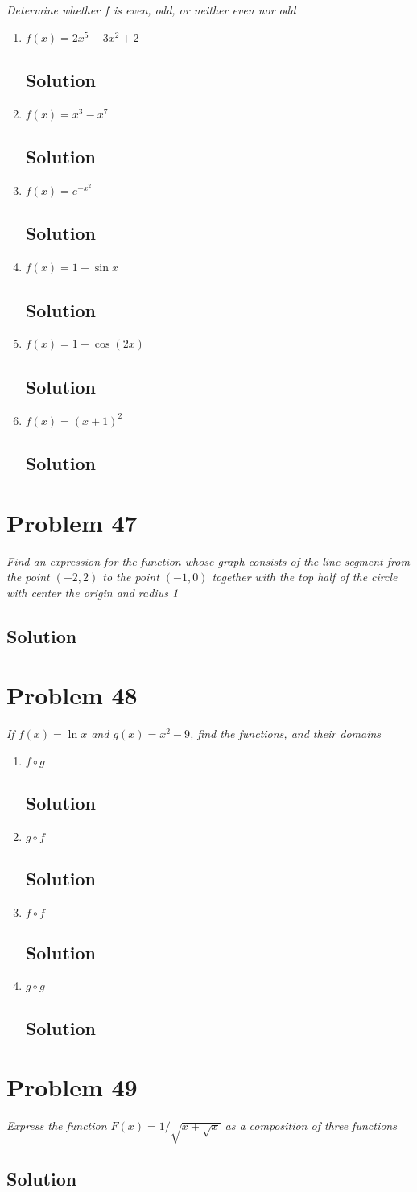 \documentclass[11pt]{article}
\newcommand{\soln}{\subsection*}
\newcommand{\qn}{\textit}
\begin{document}
\qn{Determine whether $f$ is even, odd, or neither even nor odd}
\begin{enumerate}
	\item \qn{$f(x)=2x^5-3x^2+2$}
	\soln{Solution}
	
	\item \qn{$f(x)=x^3-x^7$}
	\soln{Solution}
	
	\item \qn{$f(x)=e^{-x^2}$}
	\soln{Solution}
	
	\item \qn{$f(x)=1+\sin{x}$}
	\soln{Solution}
	
	\item \qn{$f(x)=1-\cos(2x)$}
	\soln{Solution}
	
	\item \qn{$f(x)=(x+1)^2$}
	\soln{Solution}
\end{enumerate}

\section*{Problem 47}

\qn{Find an expression for the function whose graph consists of the line segment from the point $(-2, 2)$ to the point $(-1, 0)$ together with the top half of the circle with center the origin and radius 1}
\soln{Solution}

\section*{Problem 48}

\qn{If $f(x)=\ln{x}$ and $g(x)=x^2-9$, find the functions, and their domains}
\begin{enumerate}
	\item \qn{$f \circ g$}
	\soln{Solution}
	
	\item \qn{$g \circ f$}
	\soln{Solution}
	
	\item \qn{$f \circ f$}
	\soln{Solution}
	
	\item \qn{$g \circ g$}
	\soln{Solution}
\end{enumerate}

\section*{Problem 49}

\qn{Express the function $F(x)=1/\sqrt{x+\sqrt{x}}$ as a composition of three functions}
\soln{Solution}
\end{document}
